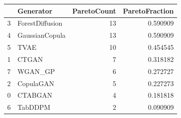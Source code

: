 \begin{tabular}{llrr}
\toprule
 & Generator & ParetoCount & ParetoFraction \\
\midrule
3 & ForestDiffusion & 13 & 0.590909 \\
4 & GaussianCopula & 13 & 0.590909 \\
5 & TVAE & 10 & 0.454545 \\
1 & CTGAN & 7 & 0.318182 \\
7 & WGAN_GP & 6 & 0.272727 \\
2 & CopulaGAN & 5 & 0.227273 \\
0 & CTABGAN & 4 & 0.181818 \\
6 & TabDDPM & 2 & 0.090909 \\
\bottomrule
\end{tabular}
